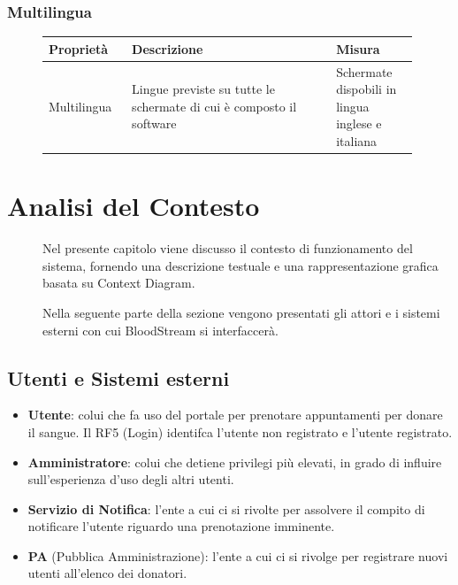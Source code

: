 \documentclass{article}
\begin{document}
\subsubsection{Multilingua}\label{rnf_8}
\begin{description}
	\item[]
	    
	\begin{table}[!htbp]
		\begin{tabular} {|>{\raggedright\arraybackslash}m{0.20\linewidth} | >{\raggedright\arraybackslash}m{0.50\linewidth}|>{\raggedright\arraybackslash}m{0.20\linewidth}|}
			\hline
			\textbf{Proprietà} & \textbf{Descrizione}                                                 & \textbf{Misura}                                  \\ \hline
			Multilingua         & Lingue previste su tutte le schermate di cui è composto il software & Schermate dispobili in lingua inglese e italiana \\ \hline
		\end{tabular}
	\end{table}
	    
\end{description}

\clearpage

\section{Analisi del Contesto}
\begin{description}
	\item[] Nel presente capitolo viene discusso il contesto di funzionamento del sistema, fornendo una descrizione testuale e una rappresentazione grafica basata su Context Diagram.
	
	Nella seguente parte della sezione vengono presentati gli attori e i sistemi esterni con cui BloodStream si interfaccerà. 
\end{description}

\subsection{Utenti e Sistemi esterni}
\begin{itemize}

\item \textbf{Utente}: colui che fa uso del portale per prenotare appuntamenti per donare il sangue. Il RF5 (Login) identifca l'utente non registrato e l'utente registrato.

\item \textbf{Amministratore}: colui che detiene privilegi più elevati, in grado di influire sull'esperienza d'uso degli altri utenti.

\item \textbf{Servizio di Notifica}: l'ente a cui ci si rivolte per assolvere il compito di notificare l'utente riguardo una prenotazione imminente.

\item \textbf{PA} (Pubblica Amministrazione): l'ente a cui ci si rivolge per registrare nuovi utenti all'elenco dei donatori. 
\end{itemize}
\end{document}
